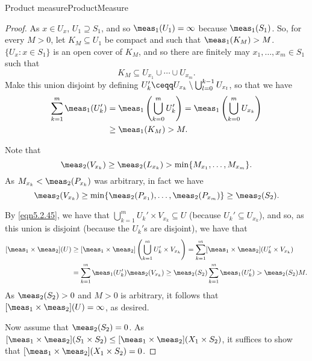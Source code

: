 \begin{thm}{Product measure}{ProductMeasure}
\begin{proof}
As $x\in U_x$, $U_1\supseteq S_1$, and so $\meas _1(U_1)=\infty$ because $\meas _1(S_1)$.  So, for every $M>0$, let $K_M\subseteq U_1$ be compact and such that $\meas _1(K_M)>M$.  $\{ U_x:x\in S_1\}$ is an open cover of $K_M$, and so there are finitely may $x_1,\ldots ,x_m\in S_1$ such that
\begin{equation}
K_M\subseteq U_{x_1}\cup \cdots \cup U_{x_m}.
\end{equation}
Make this union disjoint by defining $U_k'\ceqq U_{x_k}\setminus \bigcup _{l=0}^{k-1}U_{x_l}$, so that we have
\begin{equation}
\begin{split}
\sum _{k=1}^m\meas _1(U_k') & =\meas _1\left( \bigcup _{k=0}^mU_k'\right) =\meas _1\left( \bigcup _{k=0}^mU_{x_k}\right) \\
& \geq \meas _1(K_M)>M.
\end{split}
\end{equation}

Note that
\begin{equation}
\meas _2(V_{x_k})\geq \meas _2(L_{x_k})>\min \{ M_{x_1},\ldots ,M_{x_m}\} .
\end{equation}
As $M_{x_k}<\meas _2(P_{x_k})$ was arbitrary, in fact we have
\begin{equation}
\meas _2(V_{x_k})\geq \min \{ \meas _2(P_{x_1}),\ldots ,\meas _2(P_{x_m})\} \geq \meas _2(S_2).
\end{equation}

By \eqref{eqn5.2.45}, we have that $\bigcup _{k=1}^mU_k'\times V_{x_k}\subseteq U$ (because $U_k'\subseteq U_{x_k}$), and so, as this union is disjoint (because the $U_k'$s are disjoint), we have that
\begin{equation}
\begin{split}
[\meas _1\times \meas _2](U) & \geq [\meas _1\times \meas _2]\left( \bigcup _{k=1}^mU_k'\times V_{x_k}\right) =\sum _{k=1}^m[\meas _1\times \meas _2](U_k'\times V_{x_k}) \\
& =\sum _{k=1}^m\meas _1(U_k')\meas _2(V_{x_k})\geq \meas _2(S_2)\sum _{k=1}^m\meas _1(U_k')>\meas _2(S_2)M.
\end{split}
\end{equation}
As $\meas _2(S_2)>0$ and $M>0$ is arbitrary, it follows that $[\meas _1\times \meas _2](U)=\infty$, as desired.

Now assume that $\meas _2(S_2)=0$.  As $[\meas _1\times \meas _2](S_1\times S_2)\leq [\meas _1\times \meas _2](X_1\times S_2)$, it suffices to show that $[\meas _1\times \meas _2](X_1\times S_2)=0$.


\end{proof}
\end{thm}
